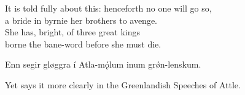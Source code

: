 \bvb It is told fully about this: henceforth no one will go so, \\
a bride in byrnie her brothers to avenge. \\
She has, bright, of three great kings \\
borne the bane-word before she must die.\evb\evg


\bvg\bva%
Enn segir gløggra í Atla-mǫ́lum inum grǿn-lenskum.\eva

\bvb Yet says it more clearly in the Greenlandish Speeches of Attle.\evb\evg

\sectionline
